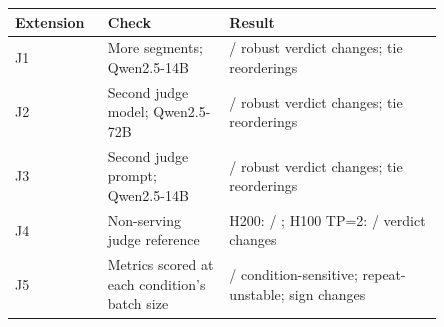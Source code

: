 \begin{tabular}{@{}p{0.16\linewidth}p{0.25\linewidth}p{0.44\linewidth}@{}}
\toprule
Extension & Check & Result \\
\midrule
J1 & More segments; Qwen2.5-14B & \ExtJOneRobust{} / \ExtJOneN{} robust verdict changes; \ExtJOneTies{} tie reorderings \\
J2 & Second judge model; Qwen2.5-72B & \ExtJTwoRobust{} / \ExtJTwoN{} robust verdict changes; \ExtJTwoTies{} tie reorderings \\
J3 & Second judge prompt; Qwen2.5-14B & \ExtJThreeRobust{} / \ExtJThreeN{} robust verdict changes; \ExtJThreeTies{} tie reorderings \\
J4 & Non-serving judge reference & H200: \ExtJFourHtwo{} / \ExtJFourN{}; H100 TP=2: \ExtJFourTptwo{} / \ExtJFourN{} verdict changes \\
J5 & Metrics scored at each condition's batch size & \ExtJFiveCond{} / \ExtJFiveN{} condition-sensitive; \ExtJFiveRepeat{} repeat-unstable; \ExtJFiveSign{} sign changes \\
\bottomrule
\end{tabular}
